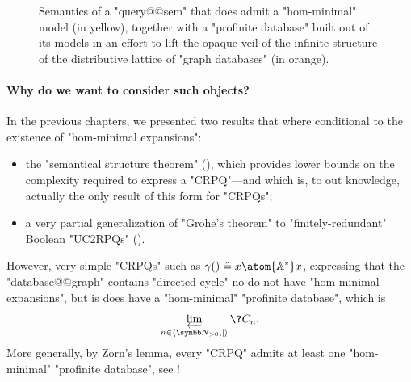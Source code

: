 \begin{figure}
	\centering
	\caption{\AP\label{fig:poset-reldb-profinite}
	Semantics of a "query@@sem" that does admit a "hom-minimal" model
	(in yellow),
	together with a "profinite database" built out of its models
	in an effort to lift the opaque veil of the infinite structure of the distributive lattice
	of "graph databases" (in orange).
	}
\end{figure}

\paragraph{Why do we want to consider such objects?}
In the previous chapters, we presented two results that where conditional
to the existence of "hom-minimal expansions":
\begin{itemize}
	\item the "semantical structure theorem" (), which
		provides lower bounds on the complexity required to express a "CRPQ"---and which is,
		to out knowledge, actually the only result of this form for "CRPQs";
	\item a very partial generalization of "Grohe's theorem" to
		"finitely-redundant" Boolean "UC2RPQs" ().
\end{itemize}
However, very simple "CRPQs" such as $\gamma() \defeq x \atom{\A^*} x$,
expressing that the "database@@graph" contains "directed cycle" no do not
have "hom-minimal expansions", but is does have a "hom-minimal" 
"profinite database", which is \[\varprojlim\limits_{n\in\tup{\Np,\mid}} \?C_{n}.\]
More generally, by Zorn's lemma, every "CRPQ" admits at least 
one "hom-minimal" "profinite database", see !

